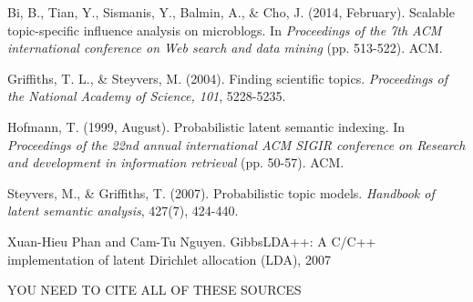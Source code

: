 \documentclass[a4paper]{article}
\begin{document}
\begin{thebibliography}{9}
Bi, B., Tian, Y., Sismanis, Y., Balmin, A., \& Cho, J. (2014, February). Scalable topic-specific influence analysis on microblogs. In \textit{Proceedings of the 7th ACM international conference on Web search and data mining} (pp. 513-522). ACM.

Griffiths, T. L., \& Steyvers, M. (2004). Finding scientific topics. \textit{Proceedings of the National Academy of Science, 101}, 5228-5235.

Hofmann, T. (1999, August). Probabilistic latent semantic indexing. In \textit{Proceedings of the 22nd annual international ACM SIGIR conference on Research and development in information retrieval} (pp. 50-57). ACM.

Steyvers, M., \& Griffiths, T. (2007). Probabilistic topic models. \textit{Handbook of latent semantic analysis}, 427(7), 424-440.

Xuan-Hieu Phan and Cam-Tu Nguyen. GibbsLDA++: A C/C++ implementation of latent Dirichlet allocation (LDA), 2007

YOU NEED TO CITE ALL OF THESE SOURCES

\end{thebibliography}
\end{document}

